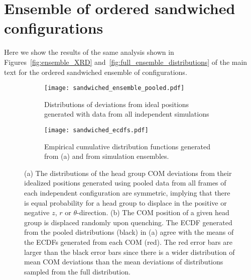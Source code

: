   \clearpage
  \section{Ensemble of ordered sandwiched configurations}\label{S-section:sandwiched_ensemble}
  
  Here we show the results of the same analysis shown in Figures~\ref{fig:ensemble_XRD} 
  and~\ref{fig:full_ensemble_distributions} of the main text for the 
  ordered sandwiched ensemble of configurations.
  
  \begin{figure}[!htb]
  \centering
  \begin{subfigure}{\textwidth}
  \texttt{[image: sandwiched\_ensemble\_pooled.pdf]}
  \caption{Distributions of deviations from ideal positions generated with data
  from all independent simulations}\label{S-fig:offset_ensemble_pooled}
  \end{subfigure}
  \begin{subfigure}{\textwidth}
  \texttt{[image: sandwiched\_ecdfs.pdf]}
  \caption{Empirical cumulative distribution functions generated from (a) and
  from simulation ensembles.}\label{S-fig:offset_ecdfs}
  \end{subfigure}
  \caption{(a) The distributions of the head group COM deviations
  from their idealized positions generated using pooled data from all
  frames of each independent configuration are symmetric, implying that 
  there is equal probability for a head group to displace in the positive
  or negative $z$, $r$ or $\theta$-direction. (b) The COM position of a 
  given head group is displaced randomly upon quenching. The ECDF generated from
  the pooled distributions (black) in (a) agree with the means of the 
  ECDFs generated from each COM (red). The red error bars are larger than
  the black error bars since there is a wider distribution of mean COM
  deviations than the mean deviations of distributions sampled from the full
  distribution.}\label{S-fig:full_ensemble_distributions}
  \end{figure} 

